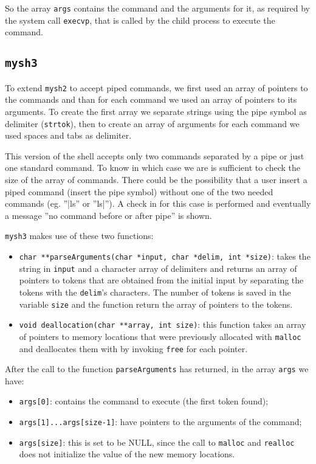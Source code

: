 So the array \texttt{args} contains the command and the arguments for it, as required by the system call \texttt{execvp}, that is called by the child process to execute the command.

\subsection{\texttt{mysh3}}
To extend \texttt{mysh2} to accept piped commands, we first used an array of pointers to the commands and than for each command we used an array of pointers to its arguments. To create the first array we separate strings using the pipe symbol as delimiter (\texttt{strtok}), then to create an array of arguments for each command we used spaces and tabs as delimiter.  \newline

This version of the shell accepts only two commands separated by a pipe or just one standard command. To know in which case we are is sufficient to check the size of the array of commands. There could be the possibility that a user insert a piped command (insert the pipe symbol) without one of the two needed commands (eg. ''|ls'' or ''ls|''). A check in for this case is performed and eventually a message ''no command before or after pipe'' is shown.\newline

\texttt{mysh3} makes use of these two functions:
\begin{itemize}
\item{\texttt{char **parseArguments(char *input, char *delim, int *size)}}: takes the string in \texttt{input} and a character array of delimiters and returns an array of pointers to tokens that are obtained from the initial input by separating the tokens with the \texttt{delim}'s characters. The number of tokens is saved in the variable \texttt{size} and the function return the array of pointers to the tokens.
\item{\texttt{void deallocation(char **array, int size)}}: this function takes an array of pointers to memory locations that were previously allocated with \texttt{malloc} and deallocates them with by invoking \texttt{free} for each pointer.
\end{itemize}

After the call to the function \texttt{parseArguments} has returned, in the array \texttt{args} we have:
\begin{itemize}
\item \texttt{args[0]}: contains the command to execute (the first token found);
\item \texttt{args[1]...args[size-1]}: have pointers to the arguments of the command;
\item \texttt{args[size]}: this is set to be NULL, since the call to \texttt{malloc} and \texttt{realloc} does not initialize the value of the new memory locations.
\end{itemize}


